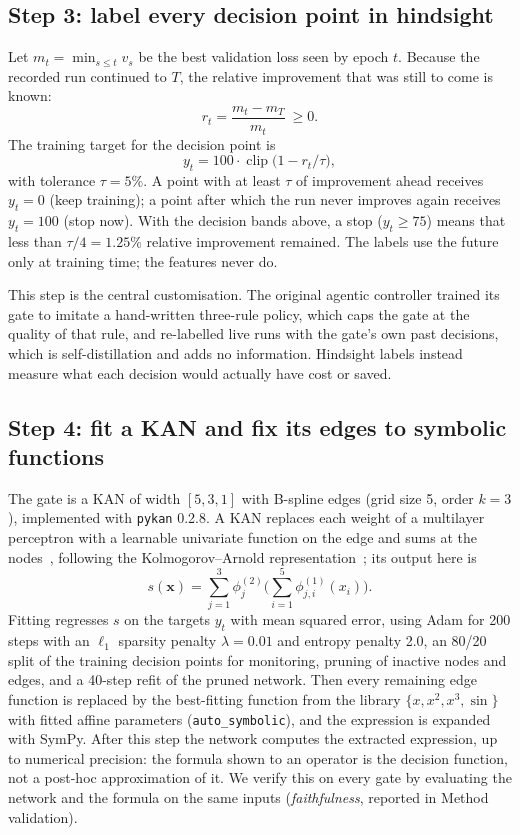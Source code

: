 \subsection*{Step 3: label every decision point in hindsight}
Let $m_t=\min_{s\le t}v_s$ be the best validation loss seen by epoch $t$. Because the recorded run continued to $T$, the relative improvement that was still to come is known:
\begin{equation}
r_t=\frac{m_t-m_T}{m_t}\ \ge 0 .
\label{eq:gain}
\end{equation}
The training target for the decision point is
\begin{equation}
y_t=100\cdot\operatorname{clip}\!\big(1-r_t/\tau\big),
\label{eq:target}
\end{equation}
with tolerance $\tau=5\%$. A point with at least $\tau$ of improvement ahead receives $y_t=0$ (keep training); a point after which the run never improves again receives $y_t=100$ (stop now). With the decision bands above, a stop ($y_t\ge75$) means that less than $\tau/4=1.25\%$ relative improvement remained. The labels use the future only at training time; the features never do.

This step is the central customisation. The original agentic controller trained its gate to imitate a hand-written three-rule policy, which caps the gate at the quality of that rule, and re-labelled live runs with the gate's own past decisions, which is self-distillation and adds no information. Hindsight labels instead measure what each decision would actually have cost or saved.

\subsection*{Step 4: fit a KAN and fix its edges to symbolic functions}
The gate is a KAN of width $[5,3,1]$ with B-spline edges (grid size 5, order $k=3$), implemented with \texttt{pykan} 0.2.8. A KAN replaces each weight of a multilayer perceptron with a learnable univariate function on the edge and sums at the nodes~\cite{liu2025kan}, following the Kolmogorov--Arnold representation~\cite{kolmogorov1957}; its output here is
\begin{equation}
s(\mathbf{x})=\sum_{j=1}^{3}\phi^{(2)}_{j}\Big(\sum_{i=1}^{5}\phi^{(1)}_{j,i}(x_i)\Big).
\label{eq:kan}
\end{equation}
Fitting regresses $s$ on the targets $y_t$ with mean squared error, using Adam for 200 steps with an $\ell_1$ sparsity penalty $\lambda=0.01$ and entropy penalty 2.0, an 80/20 split of the training decision points for monitoring, pruning of inactive nodes and edges, and a 40-step refit of the pruned network. Then every remaining edge function is replaced by the best-fitting function from the library $\{x, x^2, x^3, \sin\}$ with fitted affine parameters (\texttt{auto\_symbolic}), and the expression is expanded with SymPy. After this step the network computes the extracted expression, up to numerical precision: the formula shown to an operator is the decision function, not a post-hoc approximation of it. We verify this on every gate by evaluating the network and the formula on the same inputs (\emph{faithfulness}, reported in Method validation).

